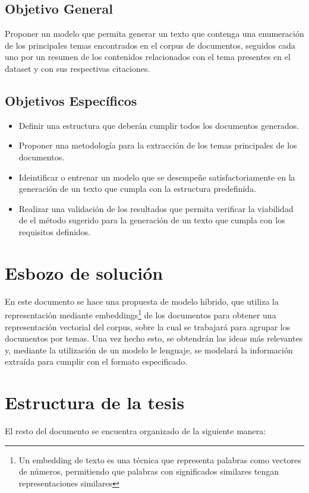     \subsection{Objetivo General}

        Proponer un modelo que permita generar un texto que contenga una enumeración de los principales temas encontrados en el corpus de documentos, seguidos cada uno por un resumen de los contenidos relacionados con el tema presentes en el dataset y con sus respectivas citaciones.

    \subsection{Objetivos Específicos}

        \begin{itemize}
            \item Definir una estructura que deberán cumplir todos los documentos generados.
            \item Proponer una metodología para la extracción de los temas principales de los documentos.
            \item Ideintificar o entrenar un modelo que se desempeñe satisfactoriamente en la generación de un texto que cumpla con la estructura predefinida.
            \item Realizar una validación de los resultados que permita verificar la viabilidad de el método sugerido para la generación de un texto que cumpla con los requisitos definidos.
        \end{itemize}
\section{Esbozo de solución}
    En este documento se hace una propuesta de modelo híbrido, que utiliza la representación mediante embeddings\footnote{Un embedding de texto es una técnica que representa palabras como vectores de números, permitiendo que palabras con significados similares tengan representaciones similares}
    de los documentos para obtener una representación vectorial del corpus, sobre la cual se trabajará para agrupar los documentos por temas. Una vez hecho esto, se obtendrán las ideas más relevantes y, mediante la utilización de un modelo le lenguaje, se modelará la información extraída para cumplir con el formato especificado.

\section{Estructura de la tesis}
        El resto del documento se encuentra organizado de la siguiente manera:

